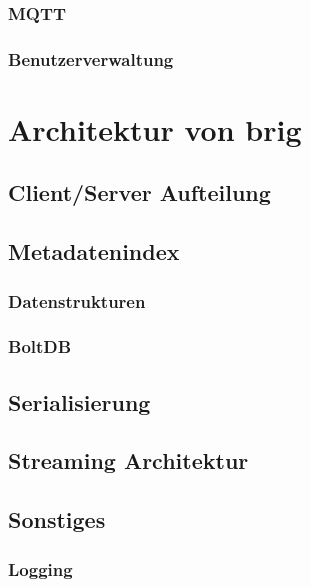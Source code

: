\documentclass[11pt,ngerman,toc=listof,index=totoc]{scrreprt}
\begin{document}
\subsection{MQTT}\label{mqtt}

\subsection{Benutzerverwaltung}\label{benutzerverwaltung}

\chapter{Architektur von brig}\label{architektur-von-brig}

\section{Client/Server Aufteilung}\label{clientserver-aufteilung}

\section{Metadatenindex}\label{metadatenindex}

\subsection{Datenstrukturen}\label{datenstrukturen}

\subsection{BoltDB}\label{boltdb}

\section{Serialisierung}\label{serialisierung}

\section{Streaming Architektur}\label{streaming-architektur}

\section{Sonstiges}\label{sonstiges}

\subsection{Logging}\label{logging}
\end{document}
